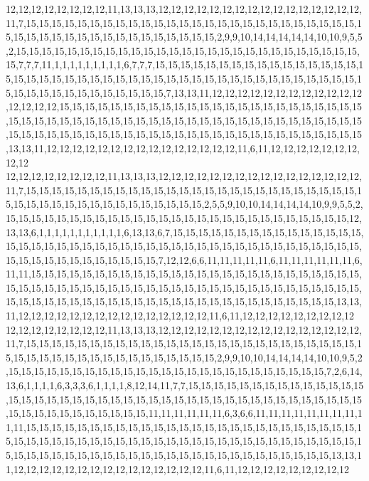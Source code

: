 12,12,12,12,12,12,12,12,11,13,13,13,12,12,12,12,12,12,12,12,12,12,12,12,12,12,12,12,11,7,15,15,15,15,15,15,15,15,15,15,15,15,15,15,15,15,15,15,15,15,15,15,15,15,15,15,15,15,15,15,15,15,15,15,15,15,15,15,15,15,15,15,15,2,9,9,10,14,14,14,14,14,10,10,9,5,5,2,15,15,15,15,15,15,15,15,15,15,15,15,15,15,15,15,15,15,15,15,15,15,15,15,15,15,15,15,7,7,7,11,1,1,1,1,1,1,1,1,1,6,7,7,7,15,15,15,15,15,15,15,15,15,15,15,15,15,15,15,15,15,15,15,15,15,15,15,15,15,15,15,15,15,15,15,15,15,15,15,15,15,15,15,15,15,15,15,15,15,15,15,15,15,15,15,15,15,15,15,15,15,7,13,13,11,12,12,12,12,12,12,12,12,12,12,12,12,12,12,12,12,15,15,15,15,15,15,15,15,15,15,15,15,15,15,15,15,15,15,15,15,15,15,15,15,15,15,15,15,15,15,15,15,15,15,15,15,15,15,15,15,15,15,15,15,15,15,15,15,15,15,15,15,15,15,15,15,15,15,15,15,15,15,15,15,15,15,15,15,15,15,15,15,15,15,15,15,15,15,15,15,13,13,11,12,12,12,12,12,12,12,12,12,12,12,12,12,12,12,11,6,11,12,12,12,12,12,12,12,12,12
12,12,12,12,12,12,12,12,11,13,13,13,12,12,12,12,12,12,12,12,12,12,12,12,12,12,12,12,11,7,15,15,15,15,15,15,15,15,15,15,15,15,15,15,15,15,15,15,15,15,15,15,15,15,15,15,15,15,15,15,15,15,15,15,15,15,15,15,15,15,15,15,2,5,5,9,10,10,14,14,14,14,10,9,9,5,5,2,15,15,15,15,15,15,15,15,15,15,15,15,15,15,15,15,15,15,15,15,15,15,15,15,15,15,15,12,13,13,6,1,1,1,1,1,1,1,1,1,1,1,6,13,13,6,7,15,15,15,15,15,15,15,15,15,15,15,15,15,15,15,15,15,15,15,15,15,15,15,15,15,15,15,15,15,15,15,15,15,15,15,15,15,15,15,15,15,15,15,15,15,15,15,15,15,15,15,15,15,15,15,7,12,12,6,6,11,11,11,11,11,6,11,11,11,11,11,11,6,11,11,15,15,15,15,15,15,15,15,15,15,15,15,15,15,15,15,15,15,15,15,15,15,15,15,15,15,15,15,15,15,15,15,15,15,15,15,15,15,15,15,15,15,15,15,15,15,15,15,15,15,15,15,15,15,15,15,15,15,15,15,15,15,15,15,15,15,15,15,15,15,15,15,15,15,15,15,15,15,15,15,13,13,11,12,12,12,12,12,12,12,12,12,12,12,12,12,12,12,11,6,11,12,12,12,12,12,12,12,12,12
12,12,12,12,12,12,12,12,11,13,13,13,12,12,12,12,12,12,12,12,12,12,12,12,12,12,12,12,11,7,15,15,15,15,15,15,15,15,15,15,15,15,15,15,15,15,15,15,15,15,15,15,15,15,15,15,15,15,15,15,15,15,15,15,15,15,15,15,15,15,15,15,15,2,9,9,10,10,14,14,14,14,10,10,9,5,2,15,15,15,15,15,15,15,15,15,15,15,15,15,15,15,15,15,15,15,15,15,15,15,15,15,7,2,6,14,13,6,1,1,1,1,6,3,3,3,6,1,1,1,1,8,12,14,11,7,7,15,15,15,15,15,15,15,15,15,15,15,15,15,15,15,15,15,15,15,15,15,15,15,15,15,15,15,15,15,15,15,15,15,15,15,15,15,15,15,15,15,15,15,15,15,15,15,15,15,15,15,15,15,11,11,11,11,11,11,6,3,6,6,11,11,11,11,11,11,11,11,11,11,15,15,15,15,15,15,15,15,15,15,15,15,15,15,15,15,15,15,15,15,15,15,15,15,15,15,15,15,15,15,15,15,15,15,15,15,15,15,15,15,15,15,15,15,15,15,15,15,15,15,15,15,15,15,15,15,15,15,15,15,15,15,15,15,15,15,15,15,15,15,15,15,15,15,15,15,15,15,15,15,13,13,11,12,12,12,12,12,12,12,12,12,12,12,12,12,12,12,11,6,11,12,12,12,12,12,12,12,12,12
